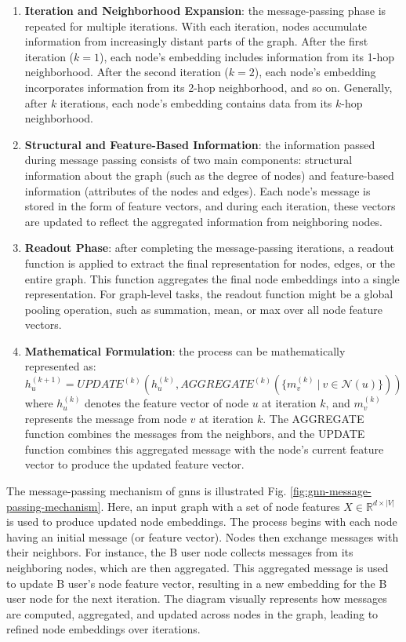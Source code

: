 \begin{enumerate}
    \item \textbf{Iteration and Neighborhood Expansion}: the message-passing phase is repeated for multiple iterations. With each iteration, nodes accumulate information from increasingly distant parts of the graph. After the first iteration (\(k=1\)), each node's embedding includes information from its 1-hop neighborhood. After the second iteration (\(k=2\)), each node's embedding incorporates information from its 2-hop neighborhood, and so on. Generally, after \(k\) iterations, each node's embedding contains data from its \(k\)-hop neighborhood.

    \item \textbf{Structural and Feature-Based Information}: the information passed during message passing consists of two main components: structural information about the graph (such as the degree of nodes) and feature-based information (attributes of the nodes and edges). Each node's message is stored in the form of feature vectors, and during each iteration, these vectors are updated to reflect the aggregated information from neighboring nodes.

    \item \textbf{Readout Phase}: after completing the message-passing iterations, a readout function is applied to extract the final representation for nodes, edges, or the entire graph. This function aggregates the final node embeddings into a single representation. For graph-level tasks, the readout function might be a global pooling operation, such as summation, mean, or max over all node feature vectors.

    \item \textbf{Mathematical Formulation}: the process can be mathematically represented as:
   \[
   h_u^{(k+1)} = UPDATE^{(k)}\left(h_u^{(k)}, AGGREGATE^{(k)}\left(\{m_{v}^{(k)}~|~v \in \mathcal{N}(u)\}\right)\right)
   \]
   where \(h_u^{(k)}\) denotes the feature vector of node \(u\) at iteration \(k\), and \(m_{v}^{(k)}\) represents the message from node \(v\) at iteration \(k\). The AGGREGATE function combines the messages from the neighbors, and the UPDATE function combines this aggregated message with the node's current feature vector to produce the updated feature vector.


\end{enumerate}

The message-passing mechanism of \glspl{gnn} is illustrated Fig. \ref{fig:gnn-message-passing-mechanism}.
Here, an input graph with a set of node features \(X \in \mathbb{R}^{d \times |V|}\) is used to produce updated node embeddings.
The process begins with each node having an initial message (or feature vector).
Nodes then exchange messages with their neighbors. For instance, the B user node collects messages from its neighboring nodes, which are then aggregated.
This aggregated message is used to update B user's node feature vector, resulting in a new embedding for the B user node for the next iteration.
The diagram visually represents how messages are computed, aggregated, and updated across nodes in the graph, leading to refined node embeddings over iterations.

